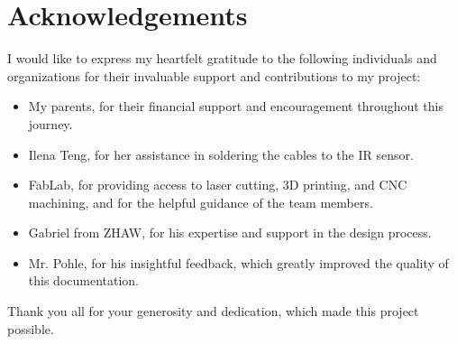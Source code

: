 \section{Acknowledgements}\label{sec:acknowledgements}
I would like to express my heartfelt gratitude to the following individuals and organizations for their invaluable support and contributions to my project:
\begin{itemize}
    \item My parents, for their financial support and encouragement throughout this journey.
    \item Ilena Teng, for her assistance in soldering the cables to the IR sensor.
    \item FabLab, for providing access to laser cutting, 3D printing, and CNC machining, and for the helpful guidance of the team members.
    \item Gabriel from ZHAW, for his expertise and support in the design process.
    \item Mr. Pohle, for his insightful feedback, which greatly improved the quality of this documentation.
\end{itemize}
Thank you all for your generosity and dedication, which made this project possible.









